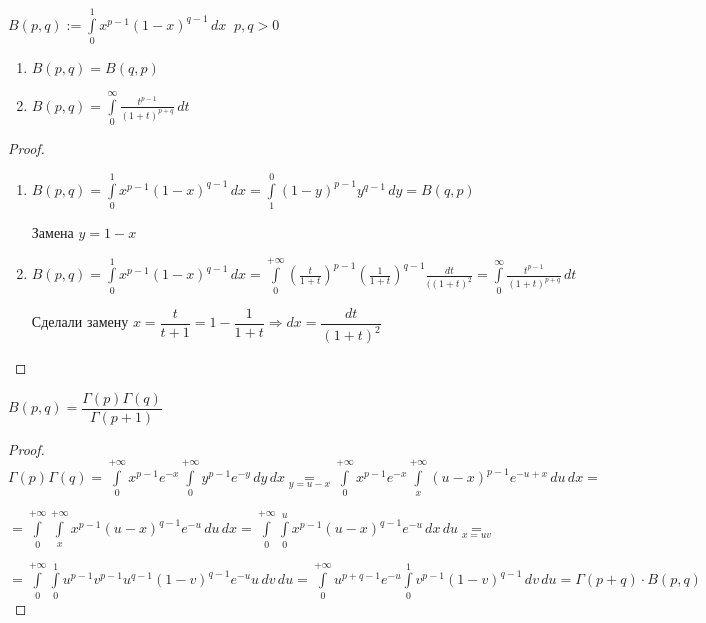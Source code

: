 
\begin{definition}\thmslashn
	
	$B(p, q) := \int\limits_{0}^{1} x^{p-1}(1-x)^{q-1}\,dx \;\; p, q > 0$
	
\end{definition}

\begin{properties}[$B$-функции]\thmslashn
	
	\begin{enumerate}
		\item 
		$B(p, q) = B(q, p)$
		\item 
		$B(p, q) = \int\limits_{0}^{\infty}\frac{t^{p-1}}{(1+t)^{p+q}}\,dt$
	\end{enumerate}
	
\end{properties}

\begin{proof}\thmslashn

	\begin{enumerate}
		\item 
		$B(p, q) = \int\limits_{0}^{1} x^{p-1}(1-x)^{q-1}\,dx = \int\limits_{1}^{0} (1-y)^{p-1}y^{q-1}\,dy = B(q, p)$
		
		Замена $y = 1-x$
		
		\item 
		$B(p, q) = \int\limits_{0}^{1} x^{p-1}(1-x)^{q-1}\,dx =\int\limits_{0}^{+\infty} \left(\frac{t}{1+t}\right)^{p-1}\left(\frac{1}{1+t}\right)^{q-1}\frac{dt}{((1+t)^2} = \int\limits_{0}^{\infty} \frac{t^{p-1}}{(1+t)^{p+q}}\,dt$
		
		Сделали замену $x = \dfrac{t}{t+1} = 1- \dfrac{1}{1+t} \Rightarrow dx = \dfrac{dt}{(1+t)^2}$
	\end{enumerate}

\end{proof}

\begin{theorem}
	$B(p, q) = \dfrac{\Gamma(p) \Gamma(q)}{\Gamma(p+1)}$
\end{theorem}


\begin{proof}\thmslashn
	
	$\Gamma(p)\Gamma(q) = \int\limits_{0}^{+\infty} x^{p-1} e^{-x} \int\limits_{0}^{+\infty} y^{p-1} e^{-y} \,dy\,dx \underset{y = u-x}= \int\limits_{0}^{+\infty} x^{p-1} e^{-x} \int\limits_{x}^{+\infty} (u-x)^{p-1} e^{-u+x} \,du\,dx = $
	
	
	$=\int\limits_{0}^{+\infty} \int\limits_{x}^{+\infty} x^{p-1}(u-x)^{q-1} e^{-u} \,du\,dx = \int\limits_{0}^{+\infty} \int\limits_{0}^{u} x^{p-1}(u-x)^{q-1} e^{-u} \,dx\,du \underset{x = uv}=$
	

	$=\int\limits_{0}^{+\infty} \int\limits_{0}^{1} u^{p-1}v^{p-1}u^{q-1} (1-v)^{q-1} e^{-u} u \,dv\,du = \int\limits_{0}^{+\infty} u^{p+q-1} e^{-u} \int\limits_{0}^{1} v^{p-1}(1-v)^{q-1} \,dv\,du = \Gamma(p+q)\cdot B(p, q)$
	
\end{proof}
